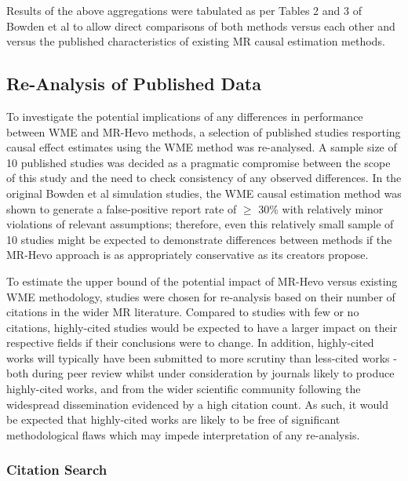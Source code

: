 \documentclass[
]{article}
\begin{document}
Results of the above aggregations were tabulated as per Tables 2 and 3 of Bowden et al\textsuperscript{} to allow direct comparisons of both methods versus each other and versus the published characteristics of existing MR causal estimation methods.

\subsection{Re-Analysis of Published Data}\label{re-analysis-of-published-data}

To investigate the potential implications of any differences in performance between WME and MR-Hevo methods, a selection of published studies resporting causal effect estimates using the WME method was re-analysed. A sample size of 10 published studies was decided as a pragmatic compromise between the scope of this study and the need to check consistency of any observed differences. In the original Bowden et al simulation studies, the WME causal estimation method was shown to generate a false-positive report rate of \(\ge\) 30\% with relatively minor violations of relevant assumptions\textsuperscript{}; therefore, even this relatively small sample of 10 studies might be expected to demonstrate differences between methods if the MR-Hevo approach is as appropriately conservative as its creators propose.

To estimate the upper bound of the potential impact of MR-Hevo versus existing WME methodology, studies were chosen for re-analysis based on their number of citations in the wider MR literature. Compared to studies with few or no citations, highly-cited studies would be expected to have a larger impact on their respective fields if their conclusions were to change. In addition, highly-cited works will typically have been submitted to more scrutiny than less-cited works - both during peer review whilst under consideration by journals likely to produce highly-cited works, and from the wider scientific community following the widespread dissemination evidenced by a high citation count. As such, it would be expected that highly-cited works are likely to be free of significant methodological flaws which may impede interpretation of any re-analysis.

\subsubsection{Citation Search}\label{citation-search}
\end{document}
